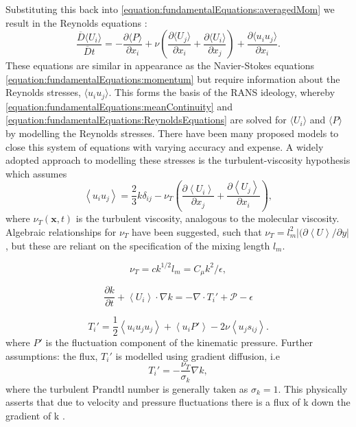 \documentclass[12pt,oneside,a4paper]{article}
\newcommand{\pdev}[2]{\frac{\partial {#1}}{\partial {#2}}}
\begin{document}
Substituting this back into \eqref{equation:fundamentalEquations:averagedMom} we result in the Reynolds equations \citep{pope2001}:
\begin{equation}
\frac{\overline{D} \langle U_i \rangle }{ \overline{D} t}
=
-\pdev{\langle P \rangle}{x_i}
+
\nu
	\left(
	\pdev{\langle U_j \rangle}{x_i}
	+
	\pdev{\langle U_i \rangle}{x_j} 
	\right)
+
\pdev{\langle u_i u_j\rangle}{x_i}.
\label{equation:fundamentalEquations:ReynoldsEquations}
\end{equation}
These equations are similar in appearance as the Navier-Stokes equations \eqref{equation:fundamentalEquations:momentum} but require information about the Reynolds stresses, $\langle u_i u_j \rangle$. This forms the basis of the RANS ideology, whereby \eqref{equation:fundamentalEquations:meanContinuity} and \eqref{equation:fundamentalEquations:ReynoldsEquations} are solved for $\langle U_i \rangle$ and $\langle P \rangle$ by modelling the Reynolds stresses. There have been many proposed models to close this system of equations with varying accuracy and expense. A widely adopted approach to modelling these stresses is the turbulent-viscosity hypothesis which assumes
\begin{equation}
\left< u_i u_j \right> = \frac{2}{3}k \delta_{ij} - \nu_T \left( 
	\pdev{\left< U_i \right>}{x_j} + \pdev{\left< U_j \right>}{x_i}	\right),
\end{equation}
where $\nu_T(\boldsymbol{x},t)$ is the turbulent viscosity, analogous to the molecular viscosity. Algebraic relationships for $\nu_T$ have been suggested, such that $\nu_T=l_m^2 \left| (\partial \left<U\right> / \partial y   \right|$, but these are reliant on the specification of the mixing length $l_m$. 

\begin{equation}
\nu_T = c k^{1/2} l_m = C_\mu k^2/\epsilon,
\end{equation}


\begin{equation}
\pdev{k}{t} + \left< U_i \right> \cdot \nabla k = -\nabla \cdot T_i' + \mathcal{P} - \epsilon 
\end{equation}

\begin{equation}
T_i' = \frac{1}{2} \left< u_i u_j u_j \right> + \left< u_i P' \right> - 2 \nu \left< u_j s_{ij} \right>.
\end{equation}
where $P'$ is the fluctuation component of the kinematic pressure. Further assumptions: the flux, $T_i'$ is modelled using gradient diffusion, i.e 
\begin{equation}
T_i' = -\frac{\nu_T}{\sigma_{k}} \nabla k,
\end{equation}
where the turbulent Prandtl number is generally taken as $\sigma_k=1$. This physically asserts that due to velocity and pressure fluctuations there is a flux of k down the gradient of k \citep{pope2001}.
\end{document}
